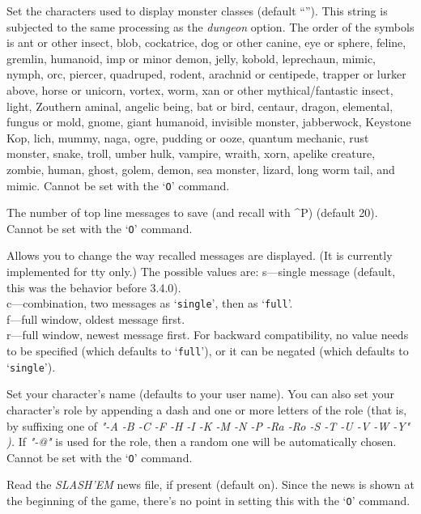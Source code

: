 \item[\ib{monsters}]
Set the characters used to display monster classes (default
``\Symbol{abcdefghijklmnopqrstuvwxyzABCDEFGHIJKLMNOPQRSTUVWXYZ@\ \'{}\&;:\~{}]}'').
This string is subjected to the same processing as the
{\it dungeon\/} 
option.
The order of the symbols is
ant or other insect, blob, cockatrice,
dog or other canine, eye or sphere, feline,
gremlin, humanoid, imp or minor demon,
jelly, kobold, leprechaun,
mimic, nymph, orc,
piercer, quadruped, rodent,
arachnid or centipede, trapper or lurker above, horse or unicorn,
vortex, worm, xan or other mythical/fantastic insect,
light, Zouthern aminal,
angelic being, bat or bird, centaur,
dragon, elemental, fungus or mold,
gnome, giant humanoid, invisible monster,
jabberwock, Keystone Kop, lich,
mummy, naga, ogre,
pudding or ooze, quantum mechanic, rust monster,
snake, troll, umber hulk,
vampire, wraith, xorn,
apelike creature, zombie,
human, ghost, golem,
demon, sea monster, lizard,
long worm tail, and mimic.
Cannot be set with the `{\tt O}' command.

\item[\ib{msghistory}]
The number of top line messages to save (and recall with \^{}P) (default 20).
Cannot be set with the `{\tt O}' command.

\item[\ib{msg\_window}]
Allows you to change the way recalled messages are displayed.
(It is currently implemented for tty only.)
The possible values are:
s---single message (default, this was the behavior before 3.4.0).\\
c---combination, two messages as `{\tt single}', then as `{\tt full}'.\\
f---full window, oldest message first.\\
r---full window, newest message first.
For backward compatibility, no value needs to be specified (which
defaults to `{\tt full}'), or it can be negated (which defaults to `{\tt single}').

\item[\ib{name}]
Set your character's name (defaults to your user name).  You can also
set your character's role by appending a dash and one or more letters of
the role (that is, by suffixing one of
{\it "-A -B -C -F -H -I -K -M -N -P -Ra -Ro -S -T -U -V -W -Y" ).\/} 
If
{\it "-@"\/} 
is used for the role, then a random one will be automatically chosen.
Cannot be set with the `{\tt O}' command.

\item[\ib{news}]
Read the {\it SLASH'EM\/} news file, if present (default on).
Since the news is shown at the beginning of the game, there's no point
in setting this with the `{\tt O}' command.

